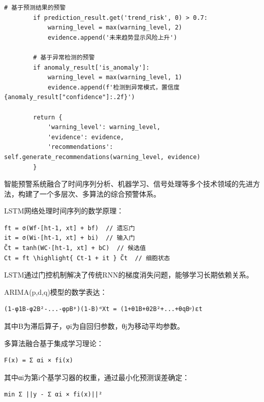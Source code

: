 \begin{lstlisting}[style=python]
        # 基于预测结果的预警  
        if prediction_result.get('trend_risk', 0) > 0.7:
            warning_level = max(warning_level, 2)
            evidence.append('未来趋势显示风险上升')
            
        # 基于异常检测的预警
        if anomaly_result['is_anomaly']:
            warning_level = max(warning_level, 1)
            evidence.append(f'检测到异常模式，置信度{anomaly_result["confidence"]:.2f}')
        
        return {
            'warning_level': warning_level,
            'evidence': evidence,
            'recommendations': self.generate_recommendations(warning_level, evidence)
        }
\end{lstlisting}


智能预警系统融合了时间序列分析、机器学习、信号处理等多个技术领域的先进方法，构建了一个多层次、多算法的综合预警体系。


LSTM网络处理时间序列的数学原理：

\begin{lstlisting}
ft = σ(Wf·[ht-1, xt] + bf)  // 遗忘门
it = σ(Wi·[ht-1, xt] + bi)  // 输入门  
C̃t = tanh(WC·[ht-1, xt] + bC)  // 候选值
Ct = ft \highlight{ Ct-1 + it } C̃t  // 细胞状态
\end{lstlisting}

LSTM通过门控机制解决了传统RNN的梯度消失问题，能够学习长期依赖关系。


ARIMA(p,d,q)模型的数学表达：

\begin{lstlisting}
(1-φ1B-φ2B²-...-φpBᵖ)(1-B)ᵈXt = (1+θ1B+θ2B²+...+θqBᵠ)εt
\end{lstlisting}

其中B为滞后算子，φi为自回归参数，θj为移动平均参数。


多算法融合基于集成学习理论：

\begin{lstlisting}
F(x) = Σ αi × fi(x)
\end{lstlisting}

其中αi为第i个基学习器的权重，通过最小化预测误差确定：

\begin{lstlisting}
min Σ ||y - Σ αi × fi(x)||²
\end{lstlisting}

